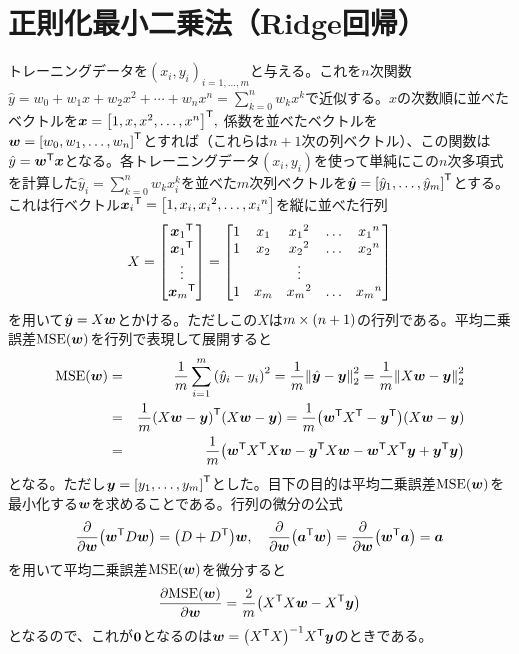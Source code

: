 \documentclass[dvipdfmx,autodetect-engine]{jsarticle}%
\begin{document}
\section{正則化最小二乗法（Ridge回帰）}
トレーニングデータを$(x_i,y_i)_{i=1,\ldots,m}$と与える。これを$n$次関数$\hat{y}=w_0+w_1 x + w_2 x^2 + \cdots + w_{n} x^{n}=\displaystyle\sum_{k=0}^{n} w_k x^{k}$で近似する。$x$の次数順に並べたベクトルを$\vb*{x}=\qty[1,x,x^2,\ldots,x^{n}]^\mathsf{T},~$係数を並べたベクトルを$\vb*{w}=\qty[w_0,w_1,\ldots,w_{n}]^\mathsf{T}$とすれば（これらは$n+1$次の列ベクトル）、この関数は$\hat{y}=\vb*{w}^\mathsf{T} \vb*{x}$となる。各トレーニングデータ$(x_i,y_i)$を使って単純にこの$n$次多項式を計算した$\hat{y}_i=\displaystyle\sum_{k=0}^{n} w_k x_{i}^{k}$を並べた$m$次列ベクトルを$\hat{\vb*{y}}=\qty[\hat{y}_1,\ldots,\hat{y}_m]^\mathsf{T}$とする。これは行ベクトル${\vb*{x}_i}^{\mathsf{T}} = \qty[1,{x_i},{x_i}^2,\ldots,{x_i}^{n}]$を縦に並べた行列
$$X=\mqty[ {\vb*{x}_1}^{\mathsf{T}} \\ {\vb*{x}_1}^{\mathsf{T}} \\ \vdots \\ {\vb*{x}_{m}}^{\mathsf{T}}]=\mqty[ 1 & x_1 & {x_1}^2 & \ldots & {x_1}^{n} \\ 1 & x_2 & {x_2}^2 & \ldots & {x_2}^{n} \\ & & \vdots & &  \\1 & x_{m} & {x_{m}}^2 & \ldots & {x_{m}}^{n} ]$$
を用いて$\hat{\vb*{y}}=X \vb*{w}$とかける。ただしこの$X$は$m\times\qty(n+1)$の行列である。平均二乗誤差$\mathrm{MSE}\qty(\vb*{w})$を行列で表現して展開すると
\begin{eqnarray*}
\mathrm{MSE}\qty(\vb*{w}) &=& \frac{1}{m} \sum_{i=1}^{m} \qty(\hat{y}_i - y_i)^2=\frac{1}{m} \norm{\hat{\vb*{y}} - \vb*{y}}_2^2 = \frac{1}{m} \norm{X\vb*{w}-\vb*{y}}_2^2 \\
&=& \frac{1}{m} \qty(X\vb*{w}-\vb*{y})^\mathsf{T} \qty(X\vb*{w}-\vb*{y}) = \frac{1}{m} \qty(\vb*{w}^\mathsf{T} X^\mathsf{T} - \vb*{y}^\mathsf{T}) \qty(X\vb*{w}-\vb*{y}) \\
&=& \frac{1}{m} \qty( \vb*{w}^\mathsf{T} X^\mathsf{T} X \vb*{w}- \vb*{y}^\mathsf{T} X \vb*{w} - \vb*{w}^\mathsf{T} X^\mathsf{T} \vb*{y} +\vb*{y}^\mathsf{T} \vb*{y} )
\end{eqnarray*}
となる。ただし$\vb*{y}=\qty[y_1,\ldots,y_m]^\mathsf{T}$とした。目下の目的は平均二乗誤差$\mathrm{MSE}\qty(\vb*{w})$を最小化する$\vb*{w}$を求めることである。行列の微分の公式
$$\pdv{\vb*{w}}\qty(\vb*{w}^\mathsf{T} D \vb*{w})=\qty(D+D^\mathsf{T})\vb*{w},~~~\pdv{\vb*{w}}\qty(\vb*{a}^\mathsf{T} \vb*{w})=\pdv{\vb*{w}}\qty(\vb*{w}^\mathsf{T} \vb*{a})=\vb*{a}$$
を用いて平均二乗誤差$\mathrm{MSE}\qty(\vb*{w})$を微分すると
$$\pdv{\mathrm{MSE}\qty(\vb*{w})}{\vb*{w}} = \frac{2}{m} \qty(X^\mathsf{T} X  \vb*{w} - X^\mathsf{T} \vb*{y})$$
となるので、これが$\vb*{0}$となるのは$\vb*{w}=\qty(X^\mathsf{T} X)^{-1} X^\mathsf{T} \vb*{y}$のときである。\\
\end{document}
